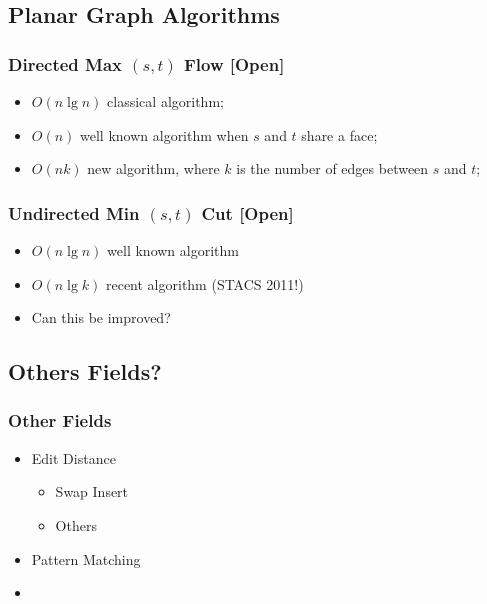 \subsection{Planar Graph Algorithms}
  \begin{frame}
    \frametitle{Directed Max $(s,t)$ Flow [Open]}
\vspace{3cm}
    \begin{itemize}
    \item $O(n\lg n)$ classical algorithm;
    \item $O(n)$ well known algorithm when $s$ and $t$ share a face;
    \item $O(nk)$ new algorithm, where $k$ is the number of edges
      between $s$ and $t$;
    \end{itemize}
  \end{frame}

  \begin{frame}
    \frametitle{Undirected Min $(s,t)$ Cut [Open]}
\vspace{3cm}
    \begin{itemize}
    \item $O(n\lg n)$ well known algorithm
    \item $O(n\lg k)$ recent algorithm (STACS 2011!)
    \item Can this be improved?
    \end{itemize}
  \end{frame}

  \begin{INUTILE}
  \subsection{Others Fields?}

  \begin{frame}
  \frametitle{Other Fields}
  \begin{itemize}
\item Edit Distance
  \begin{itemize}
\item Swap Insert \cite{2015-SPIRE-AdaptiveComputationOfTheSwapInsertCorrectionDistance-BarbayPerez}
\item Others
  \end{itemize}
\item Pattern Matching
\item
  \end{itemize}
  \end{frame}
  \end{INUTILE}



